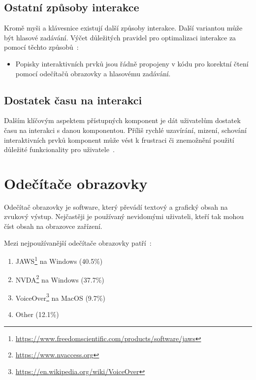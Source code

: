 \subsection{Ostatní způsoby interakce}


Kromě myši a klávesnice existují další způsoby interakce.
Další variantou může být hlasové zadávání.
Výčet důležitých pravidel pro optimalizaci interakce za pomocí těchto způsobů~\cite{w3-accessibility-principles}:


\begin{itemize}
  \item Popisky interaktivních prvků jsou řádně propojeny v kódu pro korektní čtení pomocí odečítačů obrazovky a hlasovému zadávání.
\end{itemize}

\subsection{Dostatek času na interakci}

Dalším klíčovým aspektem přístupných komponent je dát uživatelům dostatek času na interakci s danou komponentou.
Příliš rychlé uzavírání, mizení, schování interaktivních prvků komponent může vést k frustraci či znemožnění použití důležité funkcionality pro uživatele~\cite{w3-accessibility-principles}.

\section{Odečítače obrazovky}

Odečítač obrazovky je software, který převádí textový a grafický obsah na zvukový výstup.
Nejčastěji je používaný nevidomými uživateli, kteří tak mohou číst obsah na obrazovce zařízení.

Mezi nejpoužívanější odečítače obrazovky patří~\cite{webaim-survey-2024}:

\begin{enumerate}
  \item JAWS\footnote{\url{https://www.freedomscientific.com/products/software/jaws}} na Windows (40.5\%)
  \item NVDA\footnote{\url{https://www.nvaccess.org}} na Windows (37.7\%)
  \item VoiceOver\footnote{\url{https://en.wikipedia.org/wiki/VoiceOver}} na MacOS (9.7\%)
  \item Other (12.1\%)
\end{enumerate}

